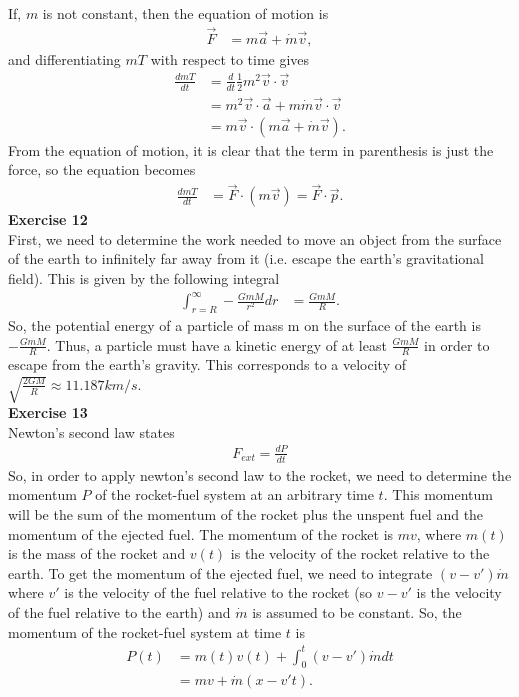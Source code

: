 \documentclass[10pt]{article}
\begin{document}
If, $m$ is not constant, then the equation of motion is
\begin{align*}
  \vec F &= m\vec a + \dot m\vec v,
\end{align*}
and differentiating $mT$ with respect to time gives
\begin{align*}
  \frac{d mT}{d t} &= \frac{d}{d t}\frac{1}{2}m^2\vec v\cdot\vec v\\
  &= m^2\vec v\cdot\vec a+m\dot m\vec v\cdot\vec v\\
  &= m\vec v\cdot(m\vec a+\dot m\vec v).
\end{align*}
From the equation of motion, it is clear that the term in parenthesis is just the force, so the equation becomes
\begin{align*}
  \frac{d mT}{dt} &= \vec F\cdot (m\vec v) = \vec F\cdot\vec p.
\end{align*}
\textbf{Exercise 12}\\
First, we need to determine the work needed to move an object from the surface of the earth to infinitely far away from it (i.e. escape the earth's gravitational field).  This is given by the following integral
\begin{align*}
  \int_{r=R}^{\infty} -\frac{GmM}{r^2}dr &= \frac{GmM}{R}.
\end{align*}
So, the potential energy of a particle of mass m on the surface of the earth is $-\frac{GmM}{R}$.  Thus, a particle must have a kinetic energy of at least $\frac{GmM}{R}$ in order to escape from the earth's gravity.  This corresponds to a velocity of $\sqrt{\frac{2GM}{R}}\approx11.187 km/s$.\\
\textbf{Exercise 13}\\
Newton's second law states
\begin{align*} F_{ext} = \frac{dP}{dt} \end{align*}
So, in order to apply newton's second law to the rocket, we need to determine 
the momentum $P$ of the rocket-fuel system at an arbitrary time $t$.  This
momentum will be the sum of the momentum of the rocket plus the unspent fuel
and the momentum of the ejected fuel.  The momentum of the rocket is $mv$, 
where $m(t)$ is the mass of the rocket and $v(t)$ is the velocity of the rocket
relative to the earth.  To get the momentum of the ejected fuel, we need to
integrate $(v-v')\dot m$ where $v'$ is the velocity of the fuel relative to
the rocket (so $v-v'$ is the velocity of the fuel relative to the earth) and
$\dot m$ is assumed to be constant.  So, the momentum of the rocket-fuel system
at time $t$ is
\begin{align*}
  P(t) &= m(t)v(t) + \int_0^t (v-v')\dot m dt\\
       &= mv + \dot m(x-v't).
\end{align*}
\end{document}
